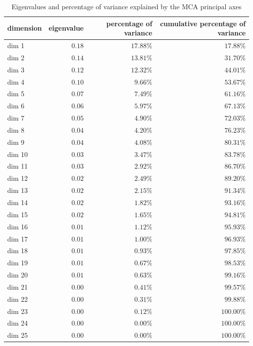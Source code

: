 \documentclass[
  authoryear,
  preprint,
  3p]{elsarticle}
\begin{document}
\hypertarget{tbl-eig}{}
\begin{longtable}{lrrr}
\caption{\label{tbl-eig}Eigenvalues and percentage of variance explained by the MCA principal
axes }\tabularnewline

\toprule
dimension & eigenvalue & percentage of variance & cumulative percentage of variance \\ 
\midrule
dim 1 & $0.18$ & $17.88\%$ & $17.88\%$ \\ 
dim 2 & $0.14$ & $13.81\%$ & $31.70\%$ \\ 
dim 3 & $0.12$ & $12.32\%$ & $44.01\%$ \\ 
dim 4 & $0.10$ & $9.66\%$ & $53.67\%$ \\ 
dim 5 & $0.07$ & $7.49\%$ & $61.16\%$ \\ 
dim 6 & $0.06$ & $5.97\%$ & $67.13\%$ \\ 
dim 7 & $0.05$ & $4.90\%$ & $72.03\%$ \\ 
dim 8 & $0.04$ & $4.20\%$ & $76.23\%$ \\ 
dim 9 & $0.04$ & $4.08\%$ & $80.31\%$ \\ 
dim 10 & $0.03$ & $3.47\%$ & $83.78\%$ \\ 
dim 11 & $0.03$ & $2.92\%$ & $86.70\%$ \\ 
dim 12 & $0.02$ & $2.49\%$ & $89.20\%$ \\ 
dim 13 & $0.02$ & $2.15\%$ & $91.34\%$ \\ 
dim 14 & $0.02$ & $1.82\%$ & $93.16\%$ \\ 
dim 15 & $0.02$ & $1.65\%$ & $94.81\%$ \\ 
dim 16 & $0.01$ & $1.12\%$ & $95.93\%$ \\ 
dim 17 & $0.01$ & $1.00\%$ & $96.93\%$ \\ 
dim 18 & $0.01$ & $0.93\%$ & $97.85\%$ \\ 
dim 19 & $0.01$ & $0.67\%$ & $98.53\%$ \\ 
dim 20 & $0.01$ & $0.63\%$ & $99.16\%$ \\ 
dim 21 & $0.00$ & $0.41\%$ & $99.57\%$ \\ 
dim 22 & $0.00$ & $0.31\%$ & $99.88\%$ \\ 
dim 23 & $0.00$ & $0.12\%$ & $100.00\%$ \\ 
dim 24 & $0.00$ & $0.00\%$ & $100.00\%$ \\ 
dim 25 & $0.00$ & $0.00\%$ & $100.00\%$ \\ 
\bottomrule
\end{longtable}
\end{document}

